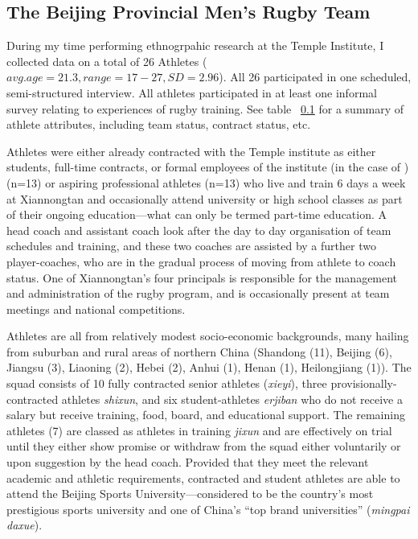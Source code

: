 \subsection{The Beijing Provincial Men's Rugby Team}
During my time performing ethnogrpahic research at the Temple Institute, I collected data on a total of 26 Athletes ($avg. age = 21.3, range = 17-27, SD = 2.96$). All 26 participated in one scheduled, semi-structured interview.  All athletes participated in at least one informal survey relating to experiences of rugby training.  See table ~\ref{} for a summary of athlete attributes, including team status, contract status, etc.


Athletes were either already contracted with the Temple institute as either students, full-time contracts, or formal employees of the institute (in the case of ) (n=13) or aspiring professional athletes (n=13) who live and train 6 days a week at Xiannongtan and occasionally attend university or high school classes as part of their ongoing education---what can only be termed part-time education.  A head coach and assistant coach look after the day to day organisation of team schedules and training, and these two coaches are assisted by a further two player-coaches, who are in the gradual process of moving from athlete to coach status.  One of Xiannongtan's four principals is responsible for the management and administration of the rugby program, and is occasionally present at team meetings and national competitions.

Athletes are all from relatively modest socio-economic backgrounds, many hailing from suburban and rural areas of northern China (Shandong (11), Beijing (6), Jiangsu (3), Liaoning (2), Hebei (2), Anhui (1), Henan (1), Heilongjiang (1)).  The squad consists of 10 fully contracted senior athletes (\textit{xieyi}), three provisionally-contracted athletes \textit{shixun}, and six student-athletes \textit{erjiban} who do not receive a salary but receive training, food, board, and educational support.  The remaining athletes (7) are classed as athletes in training \textit{jixun} and are effectively on trial until they either show promise or withdraw from the squad either voluntarily or upon suggestion by the head coach.  Provided that they meet the relevant academic and athletic requirements, contracted and student athletes are able to attend the Beijing Sports University—considered to be the country's most prestigious sports university and one of China's ``top brand universities'' (\textit{mingpai daxue}).

